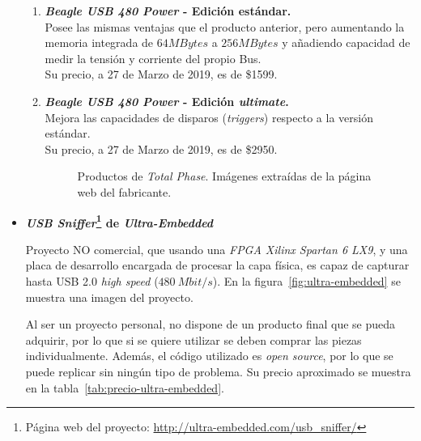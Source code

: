 \begin{itemize}
\begin{enumerate}
        \item \textbf{\emph{Beagle USB 480 Power}\cite{totalphase480-2018} - Edición estándar.} \\
        Posee las mismas ventajas que el producto anterior, pero aumentando la memoria integrada de $64MBytes$ a $256MBytes$ y añadiendo capacidad de medir la tensión y corriente del propio Bus.\\
        Su precio, a 27 de Marzo de 2019, es de \$1599.
        
        \item \textbf{\emph{Beagle USB 480 Power}\cite{totalphase480-2018} - Edición \emph{ultimate}.} \\
        Mejora las capacidades de disparos (\emph{triggers}) respecto a la versión estándar.\\
        Su precio, a 27 de Marzo de 2019, es de \$2950.
    
        \begin{figure}[htbp]
            \centering
            \caption{Productos de \emph{Total Phase}. Imágenes extraídas de la página web del fabricante.} 
            \label{fig:TotalPhase}
        \end{figure}
    \end{enumerate}
    
    \item \textbf{\emph{USB Sniffer}\footnote{Página web del proyecto: \url{http://ultra-embedded.com/usb_sniffer/}} de \emph{Ultra-Embedded}}

    Proyecto NO comercial, que usando una \emph{FPGA Xilinx Spartan 6 LX9}, y una placa de desarrollo encargada de procesar la capa física, es capaz de capturar hasta USB 2.0 \emph{high speed} ($480~Mbit/s$). En la figura~\ref{fig:ultra-embedded} se muestra una imagen del proyecto.
    
    Al ser un proyecto personal, no dispone de un producto final que se pueda adquirir, por lo que si se quiere utilizar se deben comprar las piezas individualmente. Además, el código utilizado es \emph{open source}, por lo que se puede replicar sin ningún tipo de problema. Su precio aproximado se muestra en la tabla~\ref{tab:precio-ultra-embedded}.


\end{itemize}
